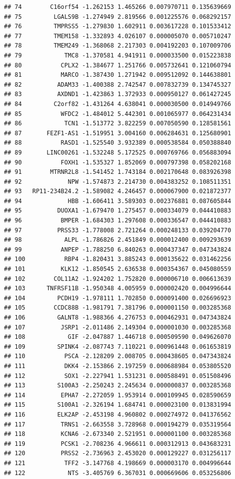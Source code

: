 \documentclass[
]{article}
\begin{document}
\begin{verbatim}
## 74        C16orf54 -1.262153 1.465266 0.007970711 0.135639669
## 75         LGALS9B -1.274949 2.819566 0.001225576 0.068292157
## 76         TMPRSS5 -1.279830 1.602911 0.003617228 0.101533412
## 77         TMEM158 -1.332893 4.026107 0.000005070 0.005710247
## 78         TMEM249 -1.368068 2.217303 0.004192203 0.107009706
## 79            TMC8 -1.370581 4.941911 0.000033500 0.015223838
## 80           CPLX2 -1.384677 1.251766 0.005732641 0.121060794
## 81           MARCO -1.387430 1.271942 0.009512092 0.144638801
## 82          ADAM33 -1.400388 2.742547 0.007832739 0.134745327
## 83          AXDND1 -1.423863 1.372933 0.000950127 0.061427245
## 84         C2orf82 -1.431264 4.638041 0.000030500 0.014949766
## 85           WFDC2 -1.484012 5.442301 0.001065977 0.064231434
## 86            TCN1 -1.513772 3.822259 0.007050590 0.128581561
## 87       FEZF1-AS1 -1.519951 3.004160 0.006284631 0.125680901
## 88           RASD1 -1.525540 3.932389 0.000538584 0.050388840
## 89       LINC00261 -1.532248 5.172525 0.000769766 0.056883094
## 90           FOXH1 -1.535327 1.852069 0.000797398 0.058202168
## 91        MTRNR2L8 -1.541452 1.743184 0.002170648 0.083926398
## 92             NPW -1.574873 2.214730 0.004383252 0.108511351
## 93   RP11-234B24.2 -1.589082 4.246457 0.000067900 0.021872377
## 94             HBB -1.606411 3.589303 0.002376881 0.087605844
## 95          DUOXA1 -1.679470 1.275457 0.000334079 0.044410883
## 96           BMPER -1.684303 1.297608 0.000336547 0.044410883
## 97          PRSS33 -1.778008 2.721264 0.000248133 0.039204770
## 98            ALPL -1.786826 2.451849 0.000012400 0.009293639
## 99           ANPEP -1.788250 6.840263 0.000437347 0.047343824
## 100           RBP4 -1.820431 3.885243 0.000135622 0.031462256
## 101          KLK12 -1.850545 2.636538 0.000354367 0.045080559
## 102        COL11A2 -1.924202 1.752820 0.000006710 0.006613639
## 103      TNFRSF11B -1.950348 4.005959 0.000002420 0.004996644
## 104         PCDH19 -1.978111 1.702850 0.000091400 0.026696923
## 105        CCDC88B -1.981791 7.381796 0.000001150 0.003285368
## 106         GALNT8 -1.988366 4.276753 0.000462931 0.047343824
## 107          JSRP1 -2.011486 2.149304 0.000001030 0.003285368
## 108            GIF -2.047887 1.446718 0.000509590 0.049626070
## 109         SPINK4 -2.087743 7.110221 0.000961448 0.061653819
## 110           PSCA -2.128209 2.008705 0.000438605 0.047343824
## 111           DKK4 -2.153866 2.197259 0.000688984 0.053805520
## 112           SOX1 -2.227941 1.531231 0.000588491 0.051508496
## 113         S100A3 -2.250243 2.245634 0.000000837 0.003285368
## 114          EPHA7 -2.272059 1.953914 0.000109945 0.028590659
## 115         S100A1 -2.326194 1.684741 0.000023100 0.013831994
## 116         ELK2AP -2.453198 4.960802 0.000274972 0.041376562
## 117          TRNS1 -2.663558 3.728968 0.000194279 0.035319564
## 118          KCNA6 -2.673340 2.521951 0.000001100 0.003285368
## 119          PCSK1 -2.708236 4.966611 0.000312913 0.043683231
## 120          PRSS2 -2.736963 2.453020 0.000129227 0.031256117
## 121           TFF2 -3.147768 4.198669 0.000003170 0.004996644
## 122            NTS -3.405769 6.367031 0.000669606 0.053256806
\end{verbatim}
\end{document}
